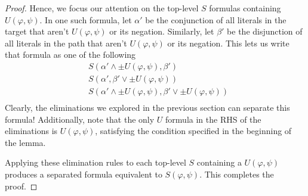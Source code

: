 \documentclass[a4paper,UKenglish,cleveref, autoref, thm-restate]{lipics-v2021}
\begin{document}
\begin{proof}
    Hence, we focus our attention on the top-level $S$ formulas containing $U(\varphi, \psi)$. In one such formula, let $\alpha'$ be the conjunction of all literals in the target that aren't $U(\varphi, \psi)$ or its negation. Similarly, let $\beta'$ be the disjunction of all literals in the path that aren't $U(\varphi, \psi)$ or its negation. This lets us write that formula as one of the following
    \begin{equation*}
        \begin{aligned}
            &S(\alpha' \land \pm U(\varphi, \psi), \beta')\\
            &S(\alpha', \beta' \lor \pm U(\varphi, \psi))\\
            &S(\alpha' \land \pm U(\varphi, \psi), \beta' \lor \pm U(\varphi, \psi))\\
        \end{aligned}
    \end{equation*}
    Clearly, the eliminations we explored in the previous section can separate this formula! Additionally, note that the only $U$ formula in the RHS of the eliminations is $U(\varphi, \psi)$, satisfying the condition specified in the beginning of the lemma.

    Applying these elimination rules to each top-level $S$ containing a $U(\varphi, \psi)$ produces a separated formula equivalent to $S(\varphi, \psi)$. This completes the proof.
\end{proof}
\end{document}
